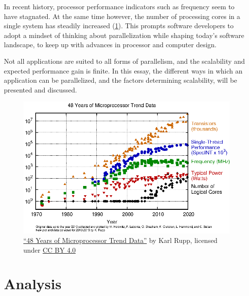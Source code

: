 \documentclass[BCOR20mm,DIV14,10pt,headinclude,footexclude,bibtotoc,liststotoc]{article}
\begin{document}
In recent history, processor performance indicators such as frequency seem to
have stagnated. At the same time however, the number of processing cores in a
single system has steadily increased (\cref{fig:processor_trend}). This prompts
software developers to adopt a mindset of thinking about parallelization while
shaping today's software landscape, to keep up with advances in processor and
computer design.

Not all applications are suited to all forms of parallelism, and the scalability
and expected performance gain is finite. In this essay, the different ways in
which an application can be parallelized, and the factors determining
scalability, will be presented and discussed.

\begin{figure}[h]
	\centering
	\includegraphics{images/48-years-processor-trend}
	\caption[48 Years of Microprocessor Trend Data]{
		\href{https://github.com/karlrupp/microprocessor-trend-data}
		{``48 Years of Microprocessor Trend Data''} by Karl Rupp, licensed under
		\href{https://creativecommons.org/licenses/by/4.0/}{CC BY 4.0}}
	\label{fig:processor_trend}
\end{figure}

\section{Analysis}
\end{document}
